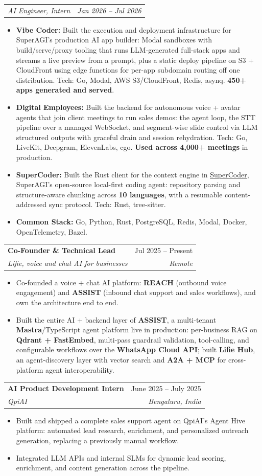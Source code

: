 \documentclass[letterpaper,11pt]{article}
\makeatletter
\newcommand{\resumeItem}[1]{
  \item\small{
    {#1 \vspace{-2pt}}
  }
}
\newcommand{\resumeSubheading}[4]{
  \vspace{-2pt}\item
    \begin{tabular*}{0.97\textwidth}[t]{l@{\extracolsep{\fill}}r}
      \textbf{#1} & #2 \\
      \textit{\small#3} & \textit{\small #4} \\
    \end{tabular*}\vspace{-7pt}
}
\newcommand{\resumeSubSubheading}[2]{
    \item
    \begin{tabular*}{0.97\textwidth}{l@{\extracolsep{\fill}}r}
      \textit{\small#1} & \textit{\small #2} \\
    \end{tabular*}\vspace{-7pt}
}
\newcommand{\resumeItemListStart}{\begin{itemize}}
\newcommand{\resumeItemListEnd}{\end{itemize}\vspace{-5pt}}
\makeatother
\begin{document}
    \resumeSubSubheading
      {AI Engineer, Intern}{Jan 2026 -- Jul 2026}
      \resumeItemListStart
        \resumeItem{\textbf{Vibe Coder:} Built the execution and deployment infrastructure for SuperAGI's production AI app builder: Modal sandboxes with build/serve/proxy tooling that runs LLM-generated full-stack apps and streams a live preview from a prompt, plus a static deploy pipeline on S3 + CloudFront using edge functions for per-app subdomain routing off one distribution. Tech: Go, Modal, AWS S3/CloudFront, Redis, asynq. \textbf{450+ apps generated and served}.}
        \resumeItem{\textbf{Digital Employees:} Built the backend for autonomous voice + avatar agents that join client meetings to run sales demos: the agent loop, the STT pipeline over a managed WebSocket, and segment-wise slide control via LLM structured outputs with graceful drain and session rehydration. Tech: Go, LiveKit, Deepgram, ElevenLabs, cgo. \textbf{Used across 4,000+ meetings} in production.}
        \resumeItem{\textbf{SuperCoder:} Built the Rust client for the context engine in \href{https://github.com/TransformerOptimus/SuperCoder}{\underline{SuperCoder}}, SuperAGI's open-source local-first coding agent: repository parsing and structure-aware chunking across \textbf{10 languages}, with a resumable content-addressed sync protocol. Tech: Rust, tree-sitter.}
        \resumeItem{\textbf{Common Stack:} Go, Python, Rust, PostgreSQL, Redis, Modal, Docker, OpenTelemetry, Bazel.}
      \resumeItemListEnd

    \newpage
    \resumeSubheading
      {Co-Founder \& Technical Lead}{Jul 2025 -- Present}
      {Lifie, voice and chat AI for businesses}{Remote}
      \resumeItemListStart
        \resumeItem{Co-founded a voice + chat AI platform: \textbf{REACH} (outbound voice engagement) and \textbf{ASSIST} (inbound chat support and sales workflows), and own the architecture end to end.}
        \resumeItem{Built the entire AI + backend layer of \textbf{ASSIST}, a multi-tenant \textbf{Mastra}/TypeScript agent platform live in production: per-business RAG on \textbf{Qdrant + FastEmbed}, multi-pass guardrail validation, tool-calling, and configurable workflows over the \textbf{WhatsApp Cloud API}; built \textbf{Lifie Hub}, an agent-discovery layer with vector search and \textbf{A2A + MCP} for cross-platform agent interoperability.}
      \resumeItemListEnd

    \resumeSubheading
      {AI Product Development Intern}{June 2025 -- July 2025}
      {QpiAI}{Bengaluru, India}
      \resumeItemListStart
        \resumeItem{Built and shipped a complete sales support agent on QpiAI's Agent Hive platform: automated lead research, enrichment, and personalized outreach generation, replacing a previously manual workflow.}
        \resumeItem{Integrated LLM APIs and internal SLMs for dynamic lead scoring, enrichment, and content generation across the pipeline.}
      \resumeItemListEnd
\end{document}
